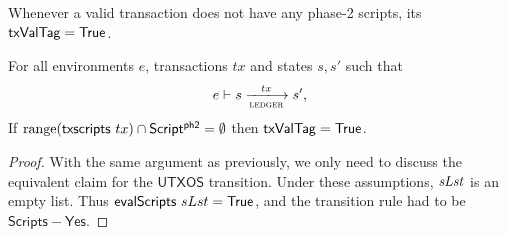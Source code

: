 \begin{property}
  \label{prop:is-valid}

Whenever a valid transaction does not have any phase-2 scripts, its
$\mathsf{txValTag} = \mathsf{True}$.

\begin{lemma}
  For all environments $e$, transactions $tx$ and states $s, s'$ such that
  \begin{equation*}
    e\vdash s\trans{ledger}{tx}s',
  \end{equation*}
  If $\operatorname{range} (\mathsf{txscripts}~tx) \cap \mathsf{Script^{ph2}} = \emptyset$
  then $\mathsf{txValTag} = \mathsf{True}$.
\end{lemma}
\begin{proof}
  With the same argument as previously, we only need to discuss the
  equivalent claim for the $\mathsf{UTXOS}$ transition. Under these
  assumptions, $\mathit{sLst}$ is an empty
  list. Thus $\mathsf{evalScripts}~sLst = \mathsf{True}$, and the transition rule
  had to be $\mathsf{Scripts{-}Yes}$.
\end{proof}
\end{property}

